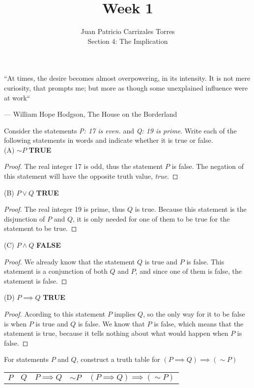\documentclass[12pt]{article}
\newenvironment{problem}[2][Problem]{\begin{trivlist}
		\item[\hskip \labelsep {\bfseries #1}\hskip \labelsep {\bfseries #2.}]}{\end{trivlist}}
\begin{document}
	
\title{Week 1}
\author{Juan Patricio Carrizales Torres \\
Section 4: The Implication}

\maketitle
\epigraph{``At times, the desire becomes almost overpowering, in its intensity. It is not mere curiosity, that prompts me; but more as though some unexplained influence were at work``}{--- \textup{William Hope Hodgson}, The House on the Borderland}

\begin{problem}{19}
	Consider the statements \emph{P: 17 is even.} and \emph{Q: 19 is prime}. Write each of the following statements in words and indicate whether it is true or false.\\

(A) $\sim P$ \textbf{TRUE}
\begin{proof}
The real integer 17 is odd, thus the statement $P$ is false. The negation of this statement will have the opposite truth value, \emph{true}.
\end{proof}
(B) $P \vee Q$ \textbf{TRUE}
\begin{proof}
The real integer 19 is prime, thus $Q$ is true. Because this statement is the disjunction of $P$ and $Q$, it is only needed for one of them to be true for the statement to be true. 
\end{proof}
(C) $P \wedge Q$ \textbf{FALSE}
\begin{proof}
	We already know that the statement $Q$ is true and $P$ is false. This statement is a conjunction of both $Q$ and $P$, and since one of them is false, the statement is false.
\end{proof}
(D) $P \implies Q$ \textbf{TRUE}
\begin{proof}
	Acording to this statement $P$ implies $Q$, so the only way for it to be false is when $P$ is true and $Q$ is false. We know that $P$ is false, which means that the statement is true, because it tells nothing about what would happen when $P$ is false. 
\end{proof}
\end{problem}
\begin{problem}{20}
For statements $P$ and $Q$, construct a truth table for $(P\implies Q)\implies (\sim P)$ 
\begin{tabular}{c c c c c}
	$P$ & $Q$ & $P \implies Q$ & $\sim P$ & $(P \implies Q) \implies (\sim P)$
\end{tabular}
\end{problem}
\end{document}
